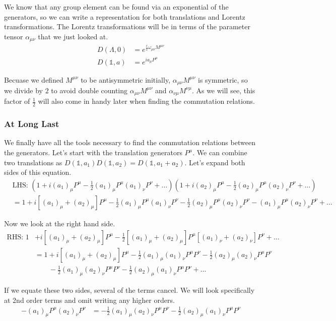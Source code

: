 \documentclass[12pt]{article}
\begin{document}
We know that any group element can be found via an exponential of the generators, so we can write a representation for both translations and Lorentz transformations. The Lorentz transformations will be in terms of the parameter tensor $\alpha_{\mu\nu}$ that we just looked at.
\begin{align}
    D(\Lambda,0)&=e^{\frac{i}{2}\omega_{\mu\nu}M^{\mu\nu}} \\
    D(\mathbb{1},a)&=e^{ia_\mu P^\mu}
\end{align}

Becuase we defined $M^{\mu\nu}$ to be antisymmetric initially, $\alpha_{\mu\nu}M^{\mu\nu}$ is symmetric, so we divide by $2$ to avoid double counting $\alpha_{\mu\nu}M^{\mu\nu}$ and $\alpha_{\nu\mu}M^{\nu\mu}$. As we will see, this factor of $\frac{1}{2}$ will also come in handy later when finding the commutation relations.

\subsubsection{At Long Last}
We finally have all the tools necessary to find the commutation relations between the generators. Let's start with the translation generators $P^\mu$. We can combine two translations as $D(\mathbb{1},a_1)D(\mathbb{1},a_2)=D(\mathbb{1},a_1+a_2)$. Let's expand both sides of this equation.
\begin{align*}
    &\text{LHS: }(1+i (a_1)_\mu P^\mu-\frac{1}{2}(a_1)_\mu P^\mu (a_1)_\nu P^\nu +\dots)(1+i (a_2)_\mu P^\mu-\frac{1}{2}(a_2)_\mu P^\mu (a_2)_\nu P^\nu+\dots) \\
    &=1+i[(a_1)_\mu+(a_2)_\mu]P^\mu-\frac{1}{2}(a_1)_\mu P^\mu (a_1)_\nu P^\nu-\frac{1}{2}(a_2)_\mu P^\mu (a_2)_\nu P^\nu-(a_1)_\mu P^\mu (a_2)_\nu P^\nu+\dots
\end{align*}

Now we look at the right hand side.
\begin{align*}
    \text{RHS: }1&+i[(a_1)_\mu+(a_2)_\mu]P^\mu-\frac{1}{2}[(a_1)_\mu+(a_2)_\mu]P^\mu[(a_1)_\nu+(a_2)_\nu]P^\nu+\dots \\
    &=1+i[(a_1)_\mu+(a_2)_\mu]P^\mu-\frac{1}{2}(a_1)_\mu(a_1)_\nu P^\mu P^\nu -\frac{1}{2}(a_2)_\mu(a_2)_\nu P^\mu P^\nu \\
    &\qquad-\frac{1}{2}(a_1)_\mu(a_2)_\nu P^\mu P^\nu-\frac{1}{2}(a_2)_\mu(a_1)_\nu P^\mu P^\nu+\dots
\end{align*}

If we equate these two sides, several of the terms cancel. We will look specifically at 2nd order terms and omit writing any higher orders.
\begin{align*}
    -(a_1)_\mu P^\mu (a_2)_\nu P^\nu&=-\frac{1}{2}(a_1)_\mu(a_2)_\nu P^\mu P^\nu-\frac{1}{2}(a_2)_\mu(a_1)_\nu P^\mu P^\nu
\end{align*}
\end{document}
